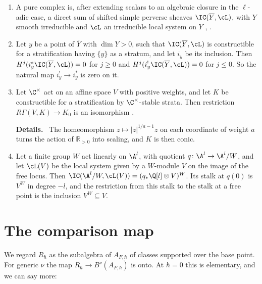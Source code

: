 \documentclass[11pt]{amsart}
\newenvironment{details}{\par\color{black!60!green}\noindent\textbf{Details.}\ }{\par}
\begin{document}
\begin{enumerate}[leftmargin=2.6em,label=(I\arabic*)]
\begin{enumerate}[label=(\alph*)]
$H^i(K_x)$ has weights $\le w+i$ (the definition \cite[\S5.1.8]{BBD}).  For
$f$ a morphism, $Rf_*$ preserves weights $\ge w$ \cite[\S5.1.14]{BBD}.  On a
smooth variety, $\Q$ is pure of weight $0$.  If $X$ is smooth and
$H^*(X)\to H^*(\fL)$ is an isomorphism for some proper $\fL\subseteq X$, then
$H^i(X)$ is pure of weight $i$: smoothness gives weights $\ge i$, and
properness of $\fL$ gives weights $\le i$.
\item A pure complex is, after extending scalars to an algebraic closure
in the $\ell$-adic case, a direct sum of shifted simple perverse sheaves
$\IC(\overline Y,\cL)$, with $Y$ smooth irreducible and $\cL$ an irreducible
local system on $Y$ \cite[\S\S5.3.8, 5.4.5]{BBD}, \cite{saitoMixedHodge1990}.
\item Let $y$ be a point of $\overline Y$ with $\dim Y>0$, such that
$\IC(\overline Y,\cL)$ is constructible for a stratification having $\{y\}$
as a stratum, and let $i_y$ be its inclusion.  Then
$H^j(i_y^*\IC(\overline Y,\cL))=0$ for $j\ge0$ and
$H^j(i_y^!\IC(\overline Y,\cL))=0$ for $j\le0$.  So the natural map
$i_y^!\to i_y^*$ is zero on it.
\item Let $\C^\times$ act on an affine space $V$ with positive weights, and
let $K$ be constructible for a stratification by $\C^\times$-stable strata.
Then restriction $R\Gamma(V,K)\to K_0$ is an isomorphism
\cite[Prop.~3.7.5]{kashiwaraSheavesManifolds1994}.
\begin{details}
The homeomorphism
$z\mapsto|z|^{1/a-1}z$ on each coordinate of weight $a$ turns the action of
$\mathbb R_{>0}$ into scaling, and $K$ is then conic.
\end{details}
\item Let a finite group $W$ act linearly on $\A^l$, with quotient
$q\colon\A^l\to\A^l/W$, and let $\cL(V)$ be the local system given by a
$W$-module $V$ on the image of the free locus.  Then
$\IC(\A^l/W,\cL(V))=(q_*\Q[l]\otimes V)^W$.  Its stalk at $q(0)$ is $V^W$ in degree $-l$, and the restriction
from this stalk to the stalk at a free point is the inclusion $V^W\subseteq
V$.
\end{enumerate}
\end{enumerate}

\section{The comparison map}\label{sec:map}
We regard $R_\hbar$ as the subalgebra of $A_{F,\hbar}$ of classes supported
over the base point.  For generic $\nu$ the map $R_\hbar\to B^\nu(A_{F,\hbar})$
is onto.  At $\hbar=0$ this is elementary, and we can say more:
\end{document}
